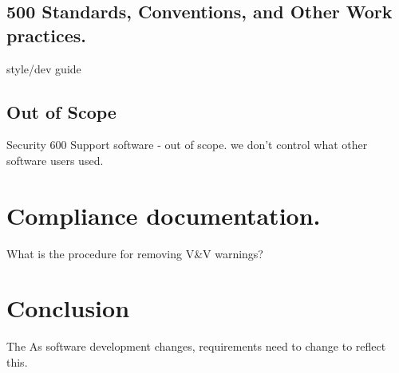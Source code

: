 \documentclass{anstrans}
\begin{document}
\subsection{500 Standards, Conventions, and Other Work practices.}

style/dev guide


\subsection{Out of Scope}
Security
600 Support software - out of scope. we don't control what other software users used. 


\section{Compliance documentation.}
What is the procedure for removing V\&V warnings?


\section{Conclusion}

The 
As software development changes, requirements need to change to reflect this.



\end{document}
